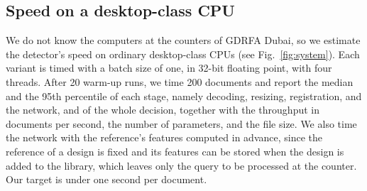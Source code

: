 \documentclass[12pt,a4paper]{article}
\begin{document}
\subsection{Speed on a desktop-class CPU}
\label{sec:deploy}
We do not know the computers at the counters of GDRFA Dubai, so we estimate the detector's speed on ordinary desktop-class CPUs (see Fig.~\ref{fig:system}). Each variant is timed with a batch size of one, in 32-bit floating point, with four threads. After 20 warm-up runs, we time 200 documents and report the median and the 95th percentile of each stage, namely decoding, resizing, registration, and the network, and of the whole decision, together with the throughput in documents per second, the number of parameters, and the file size. We also time the network with the reference's features computed in advance, since the reference of a design is fixed and its features can be stored when the design is added to the library, which leaves only the query to be processed at the counter. Our target is under one second per document.
\end{document}
